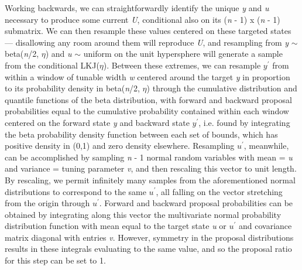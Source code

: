 Working backwards, we can straightforwardly identify the unique \textit{y} and \textit{u} necessary to produce some current \textit{U}, conditional also on its (\textit{n} - 1) x (\textit{n} - 1) submatrix. We can then resample these values centered on these targeted states --- disallowing any room around them will reproduce \textit{U}, and resampling from \textit{y} $\sim$ beta(\textit{n}/2, $\eta$) and \textit{u} $\sim$ uniform on the unit hypersphere will generate a sample from the conditional LKJ($\eta$). Between these extremes, we can resample \textit{$y^\prime$} from within a window of tunable width \textit{w} centered around the target \textit{y} in proportion to its probability density in beta(\textit{n}/2, $\eta$) through the cumulative distribution and quantile functions of the beta distribution, with forward and backward proposal probabilities equal to the cumulative probability contained within each window centered on the forward state \textit{y} and backward state \textit{$y^\prime$}, i.e. found by integrating the beta probability density function between each set of bounds, which has positive density in (0,1) and zero density elsewhere. Resampling \textit{$u^\prime$}, meanwhile, can be accomplished by sampling \textit{n} - 1 normal random variables with mean = \textit{u} and variance = tuning parameter \textit{v}, and then rescaling this vector to unit length. By rescaling, we permit infinitely many samples from the aforementioned normal distributions to correspond to the same \textit{$u^\prime$}, all falling on the vector stretching from the origin through \textit{$u^\prime$}. Forward and backward proposal probabilities can be obtained by integrating along this vector the multivariate normal probability distribution function with mean equal to the target state \textit{u} or \textit{$u^\prime$} and covariance matrix diagonal with entries \textit{v}. However, symmetry in the proposal distributions results in these integrals evaluating to the same value, and so the proposal ratio for this step can be set to 1.

